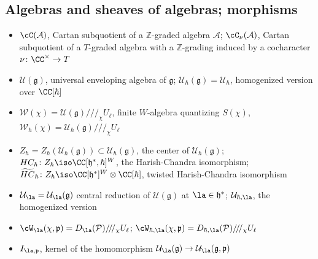\documentclass[12pt]{amsart}
\begin{document}
\subsection{Algebras and sheaves of algebras; morphisms}
   \begin{itemize}
           \item $\cC(\mathcal{A})$, Cartan subquotient of a $\mathbb{Z}$-graded algebra $\mathcal{A}$; $\cC_\nu(\mathcal{A})$, Cartan subquotient of a $T$-graded algebra with a $\mathbb{Z}$-grading induced by a cocharacter $\nu\colon \CC^\times \rightarrow T$     
           \item $\mathcal{U}(\mathfrak{g})$, universal enveloping algebra of $\mathfrak{g}$; $\mathcal{U}_\hbar(\mathfrak{g})=\mathcal{U}_\hbar$, homogenized version over $\CC[\hbar]$
       \item $\mathcal{W}(\chi)=\mathcal{U}(\mathfrak{g})/\!/\!/_\chi U_{\ell}$, finite $W$-algebra quantizing $S(\chi)$, $\mathcal{W}_\hbar(\chi)=\mathcal{U}_\hbar(\mathfrak{g})/\!/\!/_\chi U_\ell$
       \item $Z_\hbar=Z_\hbar(\mathcal{U}_\hbar(\mathfrak{g})) \subset \mathcal{U}_\hbar(\mathfrak{g})$, the center of $\mathcal{U}_\hbar(\mathfrak{g})$; $HC_\hbar\colon Z_\hbar \iso \CC[\mathfrak{h}^*,\hbar]^{W}$, the Harish-Chandra isomorphism; $\widetilde{HC}_\hbar\colon Z_\hbar \iso \CC[\mathfrak{h}^*]^{W} \otimes \CC[\hbar]$, twisted Harish-Chandra isomorphism 
       \item  $\mathcal{U}_\la=\mathcal{U}_\la(\mathfrak{g})$ central reduction of $\mathcal{U}(\mathfrak{g})$ at $\la \in \mathfrak{h}^*$; $\mathcal{U}_{\hbar,\la}$, the homogenized version
       \item $\cW_{\la}(\chi,\mathfrak{p}) = D_{\la}(\mathcal{P})/\!/\!/_\chi U_{\ell}$; $
\cW_{\hbar,\la}(\chi,\mathfrak{p}) = D_{\hbar,\la}(\mathcal{P})/\!/\!/_\chi U_{\ell}$
        \item $I_{\la,\mathfrak{p}}$, kernel of the homomorphism $\mathcal{U}_{{\la}}(\mathfrak{g}) \rightarrow \mathcal{U}_{\la}(\mathfrak{g},\mathfrak{p})$

\end{itemize}
\end{document}
